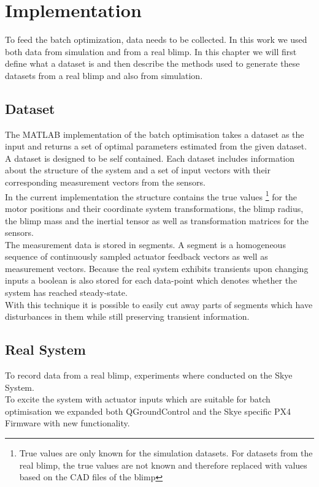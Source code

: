 \chapter{Implementation}
\label{chap:implementation}

To feed the batch optimization, data needs to be collected.
In this work we used both data from simulation and from a real blimp.
In this chapter we will first define what a dataset is and then 
describe the methods used to generate these datasets from a real blimp and also from simulation.

\section{Dataset}
\label{sec:dataset}
The \textsc{MATLAB} implementation of the batch optimisation takes a dataset as the input and returns a set of optimal parameters estimated from the given dataset. \\
A dataset is designed to be self contained. 
Each dataset includes information about the structure of the system and a set of input vectors with their corresponding measurement vectors from the sensors. \\
In the current implementation the structure contains the true values
\footnote{True values are only known for the simulation datasets. 
For datasets from the real blimp, the true values are not known and therefore replaced with values based on the CAD files of the blimp}
for the motor positions and their coordinate system transformations, the blimp radius, the blimp mass and the inertial tensor as well as transformation matrices for the sensors. \\
The measurement data is stored in segments.
A segment is a homogeneous sequence of continuously sampled actuator feedback vectors as well as measurement vectors.
Because the real system exhibits transients upon changing inputs a boolean is also stored for each data-point which denotes whether the system has reached steady-state. \\
With this technique it is possible to easily cut away parts of segments which have disturbances in them while still preserving transient information.

\section{Real System}
\label{sec:real_system}
To record data from a real blimp, experiments where conducted on the Skye System. \\
To excite the system with actuator inputs which are suitable for batch optimisation we expanded both QGroundControl and the Skye specific PX4 Firmware with new functionality.


